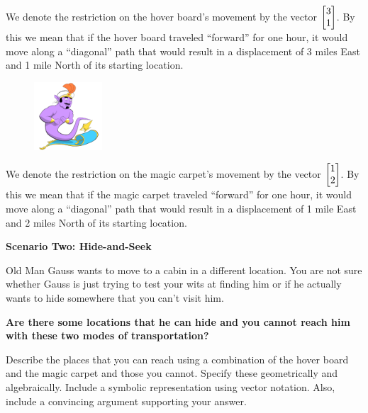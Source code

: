 \documentclass{problemset}
\begin{document}
\begin{iola}
\begin{minipage}{\textwidth}
	We denote the restriction on the hover board's movement by the vector
	$\mat{3 \\1}$. By this we mean that if
	the hover board traveled ``forward'' for one hour, it would move along a
	``diagonal'' path that would result in a displacement of 3 miles East and
	1 mile North of its starting location.
\end{minipage}

\begin{minipage}{\textwidth}
	\vspace{.5cm}
	\begin{figure}
	\vspace{-.8cm}
	\includegraphics[width=1in]{images/MagicCarpet-small.png}
	\end{figure}

	We denote the restriction on the magic carpet's movement by the vector
	$\mat{1 \\2 }$. By this we mean that if the
	magic carpet traveled ``forward'' for one hour, it would move along a
	``diagonal'' path that would result in a displacement of 1 mile East and
	2 miles North of its starting location.
	\vspace{1cm}
\end{minipage}



\textbf{Scenario Two: Hide-and-Seek}

Old Man Gauss wants to move to a cabin in a different location. You are
not sure whether Gauss is just trying to test your wits at finding him
or if he actually wants to hide somewhere that you can't visit him.

\vspace{5mm}

\textbf{Are there some locations that he can hide and you cannot reach him
with these two modes of transportation?}

Describe the places that you
can reach using a combination of the hover board and the magic carpet and
those you cannot. Specify these geometrically and algebraically. Include
a symbolic representation using vector notation. Also, include a convincing
argument supporting your answer.

\end{iola}
\end{document}
